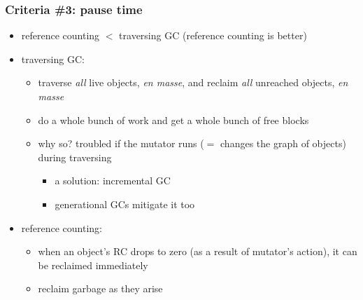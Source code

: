 \documentclass[11pt,dvipdfmx]{beamer}
\newcommand{\ao}[1]{{\color{blue}#1}}
\begin{document}
\begin{frame}
\frametitle{Criteria \#3: pause time} 
\begin{itemize}
\item<1-> reference counting $<$ traversing GC
  (reference counting is better)
\item<2-> \ao{traversing GC:} 
  \begin{itemize}
  \item traverse {\it all} live objects, {\it en masse},
    and reclaim {\it all} unreached objects, {\it en masse}
  \item do a whole bunch of work and get a whole bunch of free blocks
  \item<3-> why so?
    troubled if the mutator runs ($=$ changes the graph of objects)
    during traversing
    \begin{itemize}
    \item a solution: \ao{incremental GC}
    \item generational GCs mitigate it too
    \end{itemize}
  \end{itemize}

\item<4-> \ao{reference counting:}
  \begin{itemize}
  \item when an object's RC drops to zero
    (as a result of mutator's action),
    it can be reclaimed \ao{immediately}
  \item reclaim garbage as they arise
  \end{itemize}
\end{itemize}
\end{frame}
\fi
\end{document}
